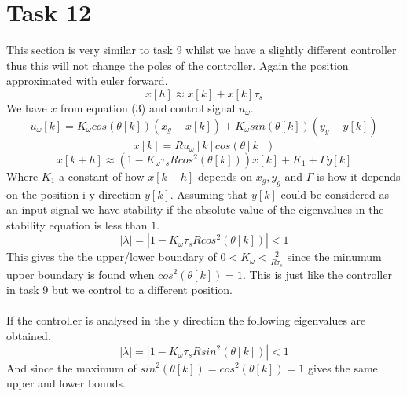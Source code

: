 \documentclass[a4paper,12pt,oneside,onecolumn]{article} %
\begin{document}
\section*{Task 12}
This section is very similar to task 9 whilst we have a slightly different controller thus this will not change the poles of the controller. Again the position approximated with euler forward. 
\begin{equation*}
x[h]\approx x[k]+\dot{x}[k]\tau_s
\end{equation*}
We have $\dot{x}$ from equation (3) and control signal $u_\omega$.
\begin{equation*}
u_\omega [k] = K_{\omega} cos(\theta [k])(x_g - x[k])+K_{\omega}sin(\theta [k]) (y_g-y[k])
\end{equation*}
\begin{equation*}
\dot{x[k]} = R u_\omega [k] cos(\theta[k])
\end{equation*}
\begin{equation*}
x[k+h]\approx  (1-K_\omega\tau_sRcos^2(\theta[k]))x[k]+K_1+\Gamma y[k]
\end{equation*}
Where $K_1$ a constant of how $x[k+h]$ depends on $x_g, y_g$ and $\Gamma$ is how it depends on the position i y direction $y[k]$. Assuming that $y[k]$ could be considered as an input signal we have stability if the absolute value of the eigenvalues in the stability equation is less than $1$.
\begin{equation*}
|\lambda |=|1-K_\omega\tau_sRcos^2(\theta[k])|<1
\end{equation*}
This gives the the upper/lower boundary of $0<K_\omega<\frac{2}{R\tau_s}$ since the minumum upper boundary is found when $cos^2(\theta[k])=1$. This is just like the controller in task 9 but we control to a different position. \\\\
If the controller is analysed in the y direction the following eigenvalues are obtained.
\begin{equation*}
|\lambda |=|1-K_\omega\tau_sRsin^2(\theta[k])|<1
\end{equation*} And since the maximum of $sin^2(\theta[k])=cos^2(\theta[k])=1$ gives the same upper and lower bounds.
\end{document}
